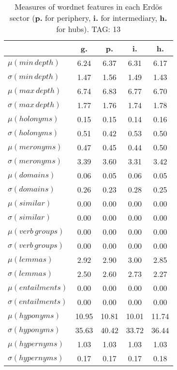 \begin{table}[h!]
\begin{center}
\begin{tabular}{| l | c | c | c | c |}\hline
 & g. & p. & i. & h. \\\hline
$\mu(min\,depth)$ & 6.24  & 6.37  & 6.31  & 6.17 \\\hline
$\sigma(min\,depth)$ & 1.47  & 1.56  & 1.49  & 1.43 \\\hline
$\mu(max\,depth)$ & 6.74  & 6.83  & 6.77  & 6.70 \\\hline
$\sigma(max\,depth)$ & 1.77  & 1.76  & 1.74  & 1.78 \\\hline
$\mu(holonyms)$ & 0.15  & 0.15  & 0.14  & 0.16 \\\hline
$\sigma(holonyms)$ & 0.51  & 0.42  & 0.53  & 0.50 \\\hline
$\mu(meronyms)$ & 0.47  & 0.45  & 0.44  & 0.50 \\\hline
$\sigma(meronyms)$ & 3.39  & 3.60  & 3.31  & 3.42 \\\hline
$\mu(domains)$ & 0.06  & 0.05  & 0.06  & 0.05 \\\hline
$\sigma(domains)$ & 0.26  & 0.23  & 0.28  & 0.25 \\\hline
$\mu(similar)$ & 0.00  & 0.00  & 0.00  & 0.00 \\\hline
$\sigma(similar)$ & 0.00  & 0.00  & 0.00  & 0.00 \\\hline
$\mu(verb\,groups)$ & 0.00  & 0.00  & 0.00  & 0.00 \\\hline
$\sigma(verb\,groups)$ & 0.00  & 0.00  & 0.00  & 0.00 \\\hline
$\mu(lemmas)$ & 2.92  & 2.90  & 3.00  & 2.85 \\\hline
$\sigma(lemmas)$ & 2.50  & 2.60  & 2.73  & 2.27 \\\hline
$\mu(entailments)$ & 0.00  & 0.00  & 0.00  & 0.00 \\\hline
$\sigma(entailments)$ & 0.00  & 0.00  & 0.00  & 0.00 \\\hline
$\mu(hyponyms)$ & 10.95  & 10.81  & 10.01  & 11.74 \\\hline
$\sigma(hyponyms)$ & 35.63  & 40.42  & 33.72  & 36.44 \\\hline
$\mu(hypernyms)$ & 1.03  & 1.03  & 1.03  & 1.03 \\\hline
$\sigma(hypernyms)$ & 0.17  & 0.17  & 0.17  & 0.18 \\\hline
\end{tabular}
\caption{Measures of wordnet features in each Erd\"os sector ({{\bf p.}} for periphery, {{\bf i.}} for intermediary, {{\bf h.}} for hubs). TAG: 13}
\end{center}
\end{table}